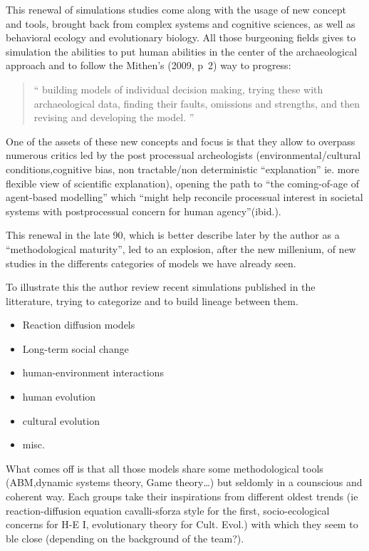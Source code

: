 \documentclass[a4paper]{article}
\begin{document}
This renewal of simulations studies come along with the usage of new concept and tools, brought back from complex systems and cognitive sciences, as well as behavioral ecology and evolutionary biology. All those burgeoning fields gives to simulation the abilities to put human abilities in the center of the archaeological approach and to follow the Mithen's (2009, p~2) way to progress:
\begin{quote}
	``
	 building models of individual decision making, trying these with archaeological data, finding their faults, omissions and strengths, and then revising and developing the model. ''
	 \nocite[p.~2]{mithen2009thoughtfulforagersastudyofprehistoricdecisionmaking}	
\end{quote}

One of the assets of these new concepts and focus is that they allow to overpass numerous critics led by the post processual archeologists (environmental/cultural conditions,cognitive bias, non tractable/non deterministic ``explanation'' ie. more flexible view of scientific explanation), opening the path to ``the coming-of-age of agent-based modelling'' \citep{lake2014trendsinarchaeologicalsimulation} which ``might help reconcile processual interest in societal systems with postprocessual concern for human agency''(ibid.).

This renewal in the late 90, which is better describe later by the author as a ``methodological maturity'', led to an explosion, after the new millenium, of new studies in the differents categories of models we have already seen.

To illustrate this the author review recent simulations published in the litterature, trying to categorize and to build lineage between them. 
\begin{itemize}
	\item Reaction diffusion models
	\item Long-term social change
	\item human-environment interactions
	\item human evolution
	\item cultural evolution
	\item misc.
\end{itemize}

What comes off is that all those models share some methodological tools (ABM,dynamic systems theory, Game theory\ldots) but seldomly in a counscious and coherent way. Each groups take their inspirations from different oldest trends (ie reaction-diffusion equation cavalli-sforza style for the first, socio-ecological concerns for H-E I, evolutionary theory for Cult. Evol.) with which they seem to ble close (depending on the background of the team?).
\end{document}

